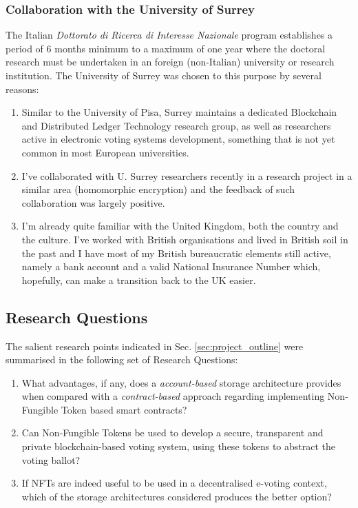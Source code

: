 \documentclass[../main.tex]{subfiles}
\begin{document}
\subsubsection{Collaboration with the University of Surrey}
The Italian \textit{Dottorato di Ricerca di Interesse Nazionale} program establishes a period of 6 months minimum to a maximum of one year where the doctoral research must be undertaken in an foreign (non-Italian) university or research institution. The University of Surrey was chosen to this purpose by several reasons:
\begin{enumerate}
    \item {Similar to the University of Pisa, Surrey maintains a dedicated Blockchain and Distributed Ledger Technology research group, as well as researchers active in electronic voting systems development, something that is not yet common in most European universities.}
    \item {I've collaborated with U. Surrey researchers recently in a research project in a similar area (homomorphic encryption) and the feedback of such collaboration was largely positive.}
    \item {I'm already quite familiar with the United Kingdom, both the country and the culture. I've worked with British organisations and lived in British soil in the past and I have most of my British bureaucratic elements still active, namely a bank account and a valid National Insurance Number which, hopefully, can make a transition back to the UK easier.}
\end{enumerate}

\subsection{Research Questions}
The salient research points indicated in Sec. \ref{sec:project_outline} were summarised in the following set of Research Questions:
\begin{enumerate}
    \item {What advantages, if any, does a \textit{account-based} storage architecture provides when compared with a \textit{contract-based} approach regarding implementing Non-Fungible Token based smart contracts?}
    \item {Can Non-Fungible Tokens be used to develop a secure, transparent and private blockchain-based voting system, using these tokens to abstract the voting ballot?}
    \item {If NFTs are indeed useful to be used in a decentralised e-voting context, which of the storage architectures considered produces the better option?}
\end{enumerate}
\end{document}
